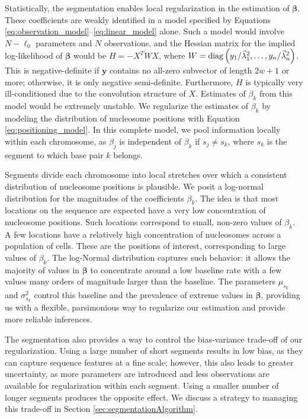 Statistically, the segmentation enables local regularization in the estimation of $\bm \beta$.
% 
These coefficients are weakly identified in a model specified by Equations \ref{eq:observation_model}--\ref{eq:linear_model} alone.
Such a model would involve $N - \ell_0$ parameters and $N$ observations, and the Hessian matrix for the implied log-likelihood of $\bm \beta$ would be $H = - X^T W X$, where $W = \mathrm{diag}\left(y_1 / \vec \lambda_1^2, \ldots, y_n / \vec \lambda_n^2\right)$.
This is negative-definite if $\bm y$ contains no all-zero subvector of length $2w+1$ or more; otherwise, it is only negative semi-definite.
Furthermore, $H$ is typically very ill-conditioned due to the convolution structure of $X$.
Estimates of $\beta_k$ from this model would be extremely unstable.
%
We regularize the estimates of $\beta_k$ by modeling the distribution of nucleosome positions with Equation \ref{eq:positioning_model}.
In this complete model, we pool information locally within each chromosome, as $\beta_j$ is independent of $\beta_k$ if $s_j \neq s_k$, where $s_k$ is the segment to which base pair $k$ belongs.


Segments divide each chromosome into local stretches over which a consistent distribution of nucleosome positions is plausible.
%
We posit a log-normal distribution for the magnitudes of the coefficients $\beta_k$.
The idea is that most locations on the sequence are expected have a very low concentration of nucleosome positions.
Such locations correspond to small, non-zero values of $\beta_k$.
A few locations have a relatively high concentration of nucleosomes across a population of cells.
These are the positions of interest, corresponding to large values of $\beta_k$.
The log-Normal distribution captures such behavior: it allows the majority of values in $\bm \beta$ to concentrate around a low baseline rate with a few values many orders of magnitude larger than the baseline.
The parameters $\mu_{s_k}$ and $\sigma^2_{s_k}$ control this baseline and the prevalence of extreme values in $\bm \beta$, providing us with a flexible, parsimonious way to regularize our estimation and provide more reliable inferences.

The segmentation also provides a way to control the bias-variance trade-off of our regularization.
Using a large number of short segments results in low bias, as they can capture sequence features at a fine scale; however, this also leads to greater uncertainty, as more parameters are introduced and less observations are available for regularization within each segment.
Using a smaller number of longer segments produces the opposite effect.
We discuss a strategy to managing this trade-off in Section \ref{sec:segmentationAlgorithm}.


